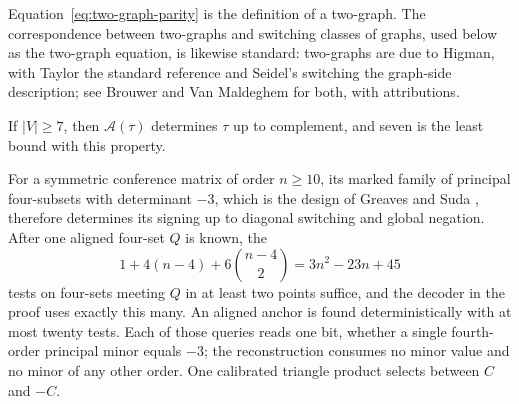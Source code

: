 Equation~\eqref{eq:two-graph-parity} is the definition of a two-graph.  The
correspondence between two-graphs and switching classes of graphs, used below
as the two-graph equation, is likewise standard: two-graphs are due to Higman,
with Taylor the standard reference and Seidel's switching the graph-side
description; see Brouwer and Van Maldeghem \cite[\S1.1.12]{BrouwerVanMaldeghem}
for both, with attributions.

\begin{theorem}
\label{thm:aligned-faithfulness}
If \(|V|\geq7\), then \(\mathcal A(\tau)\) determines \(\tau\) up to
complement, and seven is the least bound with this property.

For a symmetric conference matrix of order \(n\geq10\), its marked family of
principal four-subsets with determinant \(-3\), which is the design of
Greaves and Suda \cite[Table~1 and Example~2.3]{GreavesSuda}, therefore
determines its signing up to diagonal switching and global negation.  After
one aligned four-set \(Q\) is known, the
\[
 1+4(n-4)+6\binom{n-4}{2}=3n^2-23n+45
\]
tests on four-sets meeting \(Q\) in at least two points suffice, and the
decoder in the proof uses exactly this many.  An aligned anchor is found
deterministically with at most twenty tests.  Each of those queries reads one
bit, whether a single fourth-order principal minor equals \(-3\); the
reconstruction consumes no minor value and no minor of any other order.
One calibrated triangle product selects between \(C\) and \(-C\).
\end{theorem}

